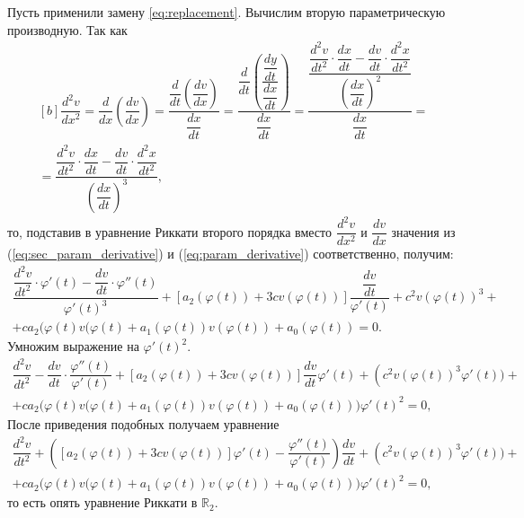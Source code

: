 Пусть применили замену \eqref{eq:replacement}. Вычислим вторую параметрическую производную.
Так как
\begin{equation}
\begin{aligned}[b]
    \dfrac{d^2v}{dx^2} = \dfrac{d}{dx} \left( \dfrac{dv}{dx} \right) = \dfrac{\dfrac{d}{dt} \left( \dfrac{dv}{dx} \right)}{\dfrac{dx}{dt}} = \dfrac{\dfrac{d}{dt} \left(\dfrac{\dfrac{dy}{dt}}{\dfrac{dx}{dt}}\right)}{\dfrac{dx}{dt}} = \dfrac{\dfrac{\dfrac{d^2v}{dt^2} \cdot \dfrac{dx}{dt} - \dfrac{dv}{dt} \cdot \dfrac{d^2x}{dt^2}}{\left( \dfrac{dx}{dt} \right)^2}}{\dfrac{dx}{dt}} = \\ = \dfrac{\dfrac{d^2v}{dt^2} \cdot \dfrac{dx}{dt} - \dfrac{dv}{dt} \cdot \dfrac{d^2x}{dt^2}}{\left( \dfrac{dx}{dt} \right)^3},
\end{aligned}  
\label{eq:sec_param_derivative}
\end{equation} 
то, подставив в уравнение Риккати второго порядка вместо $\dfrac{d^2v}{dx^2}$ и $\dfrac{dv}{dx}$ значения из (\ref{eq:sec_param_derivative}) и (\ref{eq:param_derivative}) соответственно, получим:
\begin{multline*}
    \dfrac{\dfrac{d^2v}{dt^2} \cdot \varphi'(t) - \dfrac{dv}{dt} \cdot \varphi''(t)}{\varphi'(t)^3} + \left[ a_2(\varphi(t)) + 3c v(\varphi(t)) \right] \dfrac{\dfrac{dv}{dt}}{\varphi'(t)} + c^2 v(\varphi(t))^3 + \\ + c a_2(\varphi(t) v(\varphi(t) + a_1(\varphi(t)) v(\varphi(t)) + a_0(\varphi(t)) = 0.
\end{multline*}
Умножим выражение на $\varphi'(t)^2$.
\begin{multline*}
    \dfrac{d^2v}{dt^2} - \dfrac{dv}{dt} \cdot \dfrac{\varphi''(t)}{ \varphi'(t)} + \left[ a_2(\varphi(t)) + 3c v(\varphi(t)) \right] \dfrac{dv}{dt} \varphi'(t) + \left( c^2 v(\varphi(t))^3 \varphi'(t)) + \right. \\ + c a_2(\varphi(t) v(\varphi(t) + a_1(\varphi(t)) v(\varphi(t)) + a_0(\varphi(t)) \big) \varphi'(t)^2 = 0,
\end{multline*}
После приведения подобных получаем уравнение
\begin{multline*}
    \dfrac{d^2v}{dt^2} + \left( \left[ a_2(\varphi(t)) + 3c v(\varphi(t)) \right] \varphi'(t) - \dfrac{\varphi''(t)}{ \varphi'(t)} \right) \dfrac{dv}{dt} + \left( c^2 v(\varphi(t))^3 \varphi'(t)) + \right. \\ + c a_2(\varphi(t) v(\varphi(t) + a_1(\varphi(t)) v(\varphi(t)) + a_0(\varphi(t)) \big) \varphi'(t)^2 = 0,
\end{multline*}
то есть опять уравнение Риккати в $\mathbb{R}_2$.

